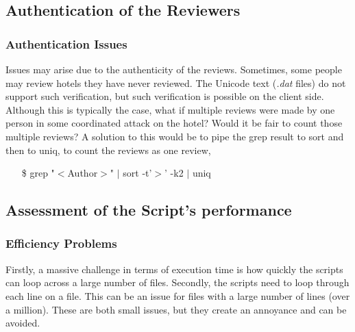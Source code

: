 \documentclass{article}
\begin{document}
	\subsection{Authentication of the Reviewers} \label{Authenticity}
	
	\subsubsection{Authentication Issues} \label{Authenticity issue}
	Issues may arise due to the authenticity of the reviews. \newline
	Sometimes, some people may review hotels they have never reviewed. The Unicode text (\textit{.dat} files) do not support such verification, but such verification is possible on the client side. 
	\newline
	Although this is typically the case, what if multiple reviews were made by one person in some coordinated attack on the hotel? Would it be fair to count those multiple
	reviews? 
	\newline 
	A solution to this would be to pipe the grep result to sort and then to uniq, to count the reviews as one review, 
	\begin{itemize}
		\item [\$] grep "$<$Author$>$" $|$ sort -t'$>$' -k2 $|$ uniq 
	\end{itemize} 
	
	\subsection{Assessment of the Script's performance} \label{Performance}
	
	\subsubsection{Efficiency Problems} \label{Efficiency Issue}
	Firstly, a massive challenge in terms of execution time is how quickly the scripts can loop across a large number of files.
	\newline
	Secondly, the scripts need to loop through each line on a file. This can be an issue for files with a large number of lines (over a million). 
	\newline
	These are both small issues, but they create an annoyance and can be avoided.
	
\end{document}
